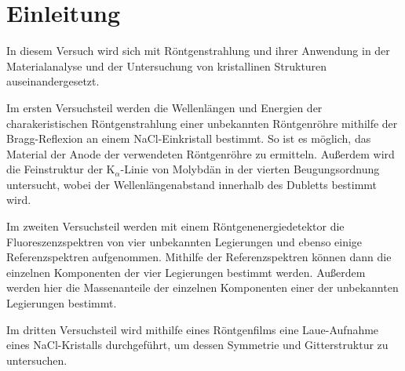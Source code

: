 \section{Einleitung}\label{sec:einleitung}
In diesem Versuch wird sich mit Röntgenstrahlung und ihrer Anwendung in der Materialanalyse und der Untersuchung von kristallinen Strukturen auseinandergesetzt.\par
Im ersten Versuchsteil werden die Wellenlängen und Energien der charakeristischen Röntgenstrahlung einer unbekannten Röntgenröhre mithilfe der Bragg-Reflexion
an einem NaCl-Einkristall bestimmt. So ist es möglich, das Material der Anode der verwendeten Röntgenröhre zu ermitteln. Außerdem wird die Feinstruktur
der $\mathrm{K}_{\alpha}$-Linie von Molybdän in der vierten Beugungsordnung untersucht, wobei der Wellenlängenabstand innerhalb des Dubletts bestimmt wird.\par
Im zweiten Versuchsteil werden mit einem Röntgenenergiedetektor die Fluoreszenzspektren von vier unbekannten Legierungen und ebenso einige Referenzspektren
aufgenommen. Mithilfe der Referenzspektren können dann die einzelnen Komponenten der vier Legierungen bestimmt werden. Außerdem werden hier
die Massenanteile der einzelnen Komponenten einer der unbekannten Legierungen bestimmt.\par
Im dritten Versuchsteil wird mithilfe eines Röntgenfilms eine Laue-Aufnahme eines NaCl-Kristalls durchgeführt, um dessen Symmetrie und Gitterstruktur zu untersuchen.